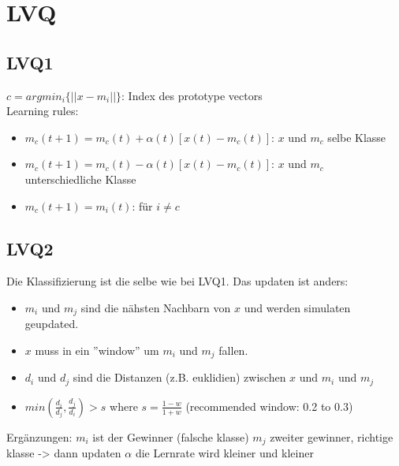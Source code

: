 \documentclass[paper=a4, fontsize=11pt]{scrartcl} %
\begin{document}
\section{LVQ}

\subsection{LVQ1}
\label{sssect:vq-lvq1}
$c = argmin_i\{||x - m_i||\}$: Index des prototype vectors\\
Learning rules:
\begin{itemize}
	\item $m_c(t + 1) = m_c(t) + \alpha(t)[x(t) - m_c(t)]$: $x$ und $m_c$ selbe Klasse
	\item $m_c(t + 1) = m_c(t) - \alpha(t)[x(t) - m_c(t)]$: $x$ und $m_c$ unterschiedliche Klasse
	\item $m_c(t + 1) = m_i(t)$: für $i \neq c$
\end{itemize}

\subsection{LVQ2}
\label{sssect:vq-lvq2}
Die Klassifizierung ist die selbe wie bei LVQ1. Das updaten ist anders:
\begin{itemize}
	\item $m_i$ und $m_j$ sind die nähsten Nachbarn von $x$ und werden simulaten geupdated.
	\item $x$ muss in ein ''window'' um $m_i$ und $m_j$ fallen.
	\item $d_i$ und $d_j$ sind die Distanzen (z.B. euklidien) zwischen $x$ und $m_i$ und $m_j$
	\item $min \left(\frac{d_i}{d_j}, \frac{d_j}{d_i}\right) > s$ where $s = \frac{1 - w}{1 + w}$ (recommended window: 0.2 to 0.3)
\end{itemize}


Ergänzungen:
$m_i$ ist der Gewinner (falsche klasse)
$m_j$ zweiter gewinner, richtige klasse -> dann updaten
$\alpha$ die Lernrate wird kleiner und kleiner
\end{document}
